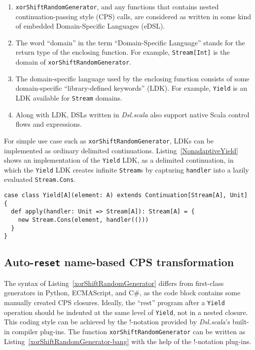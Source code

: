 \begin{enumerate}
  \item \lstinline{xorShiftRandomGenerator}, and any functions that contains nested continuation-passing style (CPS) calls, are considered as written in some kind of embedded Domain-Specific Languages (eDSL).
  \item The word ``domain'' in the term ``Domain-Specific Language'' stands for the return type of the enclosing function. For example, \lstinline{Stream[Int]} is the domain of \lstinline{xorShiftRandomGenerator}.
  \item The domain-specific language used by the enclosing function consists of some domain-specific ``library-defined keywords'' (LDK). For example, \lstinline{Yield} is an LDK available for \lstinline{Stream} domains.
  \item Along with LDK, DSLs written in \textit{Dsl.scala} also support native Scala control flows and expressions.
\end{enumerate}

For simple use case such as \lstinline{xorShiftRandomGenerator}, LDKs can be implemented as ordinary delimited continuations. Listing~\ref{NonadaptiveYield} shows an implementation of the \lstinline{Yield} LDK, as a delimited continuation, in which the \lstinline{Yield} LDK creates infinite \lstinline{Stream}s by capturing \lstinline{handler} into a lazily evaluated \lstinline{Stream.Cons}.

\begin{lstlisting}[caption={Implementing \lstinline{Yield} LDK as ordinary delimited continuations},label={NonadaptiveYield}]
case class Yield[A](element: A) extends Continuation[Stream[A], Unit] {
  def apply(handler: Unit => Stream[A]): Stream[A] = {
    new Stream.Cons(element, handler(()))
  }
}
\end{lstlisting}

\subsection{Auto-\lstinline{reset} name-based CPS transformation}\label{CPS transformation}

The syntax of Listing~\ref{xorShiftRandomGenerator} differs from first-class generators in Python, ECMAScript, and C\#, as the code block contains some manually created CPS closures. Ideally, the ``rest'' program after a \lstinline{Yield} operation should be indented at the same level of \lstinline{Yield}, not in a nested closure. This coding style can be achieved by the !-notation provided by \textit{Dsl.scala}'s built-in compiler plug-ins. The function \lstinline{xorShiftRandomGenerator} can be written as Listing~\ref{xorShiftRandomGenerator-bang} with the help of the !-notation plug-ins.

